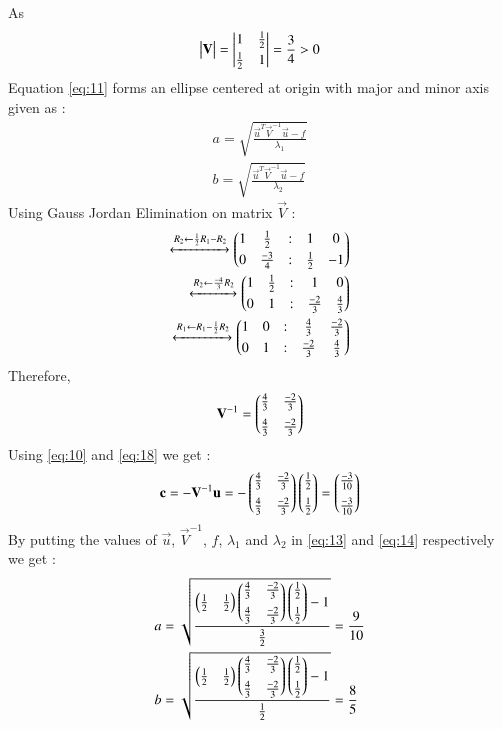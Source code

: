 \documentclass[journal,12pt,twocolumn]{IEEEtran}
\begin{document}
As
\begin{align}
    \begin{vmatrix}\mathbf{V}\end{vmatrix} =\begin{vmatrix}1&\frac{1}{2}\\[0.1cm]\frac{1}{2}&1\end{vmatrix}=\frac{3}{4}>0
\end{align}
Equation \eqref{eq:11} forms an ellipse centered at origin with major and minor axis given as : 
\begin{align}
    a=\sqrt{\frac{\vec{u}^T\vec{V}^{-1}\vec{u}-f}{\lambda_1}}\label{eq:13}\\
    b=\sqrt{\frac{\vec{u}^T\vec{V}^{-1}\vec{u}-f}{\lambda_2}}\label{eq:14}
\end{align} 
Using Gauss Jordan Elimination on matrix $\vec{V}$ : 
\begin{align}
 \xleftrightarrow{R_2 \leftarrow \frac{1}{2} R_1-R_2}\begin{pmatrix}1&\frac{1}{2}&:&1&0\\[0.1cm]0&\frac{-3}{4}&:&\frac{1}{2}&-1\end{pmatrix}\\
 \xleftrightarrow{R_2 \leftarrow \frac{-4}{3} R_2}\begin{pmatrix}1&\frac{1}{2}&:&1&0\\[0.1cm]0&1&:&\frac{-2}{3}&\frac{4}{3}\end{pmatrix}\\
 \xleftrightarrow{R_1 \leftarrow R_1-\frac{1}{2} R_2}\begin{pmatrix}1&0&:&\frac{4}{3}&\frac{-2}{3}\\[0.1cm]0&1&:&\frac{-2}{3}&\frac{4}{3}\end{pmatrix}
 \end{align}
 Therefore,
 \begin{align}
 \mathbf{V}^{-1}=\begin{pmatrix}\frac{4}{3}&\frac{-2}{3}\\[0.2cm]\frac{4}{3}&\frac{-2}{3}\end{pmatrix}\label{eq:18}
\end{align}
Using \eqref{eq:10} and \eqref{eq:18} we get : 
\begin{align}
    \mathbf{c}=-\mathbf{V}^{-1}\mathbf{u}=-\begin{pmatrix}\frac{4}{3}&\frac{-2}{3}\\[0.2cm]\frac{4}{3}&\frac{-2}{3}\end{pmatrix}\begin{pmatrix}\frac{1}{2}\\[0.2cm]\frac{1}{2}\end{pmatrix}=\begin{pmatrix}\frac{-3}{10}\\[0.2cm]\frac{-3}{10}\end{pmatrix}
\end{align}
By putting the values of $\vec{u}$, $\vec{V}^{-1}$, $f$, $\lambda_1$ and $\lambda_2$ in \eqref{eq:13} and \eqref{eq:14} respectively we get :   
\begin{align}
    a&=\sqrt{\frac{\begin{pmatrix}\frac{1}{2}&\frac{1}{2}\end{pmatrix}\begin{pmatrix}\frac{4}{3}&\frac{-2}{3}\\[0.2cm]\frac{4}{3}&\frac{-2}{3}\end{pmatrix}\begin{pmatrix}\frac{1}{2}\\[0.2cm]\frac{1}{2}\end{pmatrix}-1}{\frac{3}{2}}}=\frac{9}{10}\\
    b&=\sqrt{\frac{\begin{pmatrix}\frac{1}{2}&\frac{1}{2}\end{pmatrix}\begin{pmatrix}\frac{4}{3}&\frac{-2}{3}\\[0.2cm]\frac{4}{3}&\frac{-2}{3}\end{pmatrix}\begin{pmatrix}\frac{1}{2}\\[0.2cm]\frac{1}{2}\end{pmatrix}-1}{\frac{1}{2}}}=\frac{8}{5}
\end{align}
\end{document}

